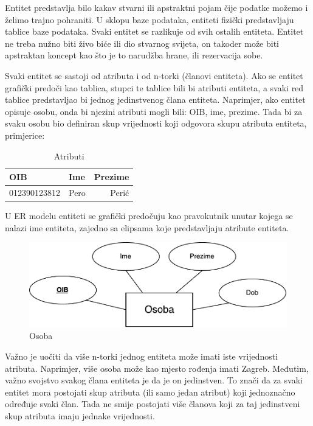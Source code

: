 \documentclass[times, utf8, zavrsni]{fer}
\begin{document}
Entitet predstavlja bilo kakav stvarni ili apstraktni pojam čije podatke možemo i želimo trajno pohraniti. U sklopu baze podataka, entiteti fizički predstavljaju tablice baze podataka. Svaki entitet se razlikuje od svih ostalih entiteta. Entitet ne treba nužno biti živo biće ili dio stvarnog svijeta, on takoder može biti apstraktan koncept kao što je to narudžba hrane, ili rezervacija sobe.

Svaki entitet se sastoji od atributa i od n-torki (članovi entiteta). Ako se entitet grafički predoči kao tablica, stupci te tablice bili bi atributi entiteta, a svaki red tablice predstavljao bi jednog jedinstvenog člana entiteta. Naprimjer, ako entitet opisuje osobu, onda bi njezini atributi mogli bili: OIB, ime, prezime. Tada bi za svaku osobu bio definiran skup vrijednosti koji odgovora skupu atributa entiteta, primjerice:\\

\begin{table}[H]
\caption{Atributi}
\label{tbl:atributi}
\centering
\begin{tabular}{llr}
\hline
OIB & Ime & Prezime\\
\hline
012390123812 & Pero & Perić\\
\hline
\end{tabular}
\end{table}

U ER modelu entiteti se grafički predočuju kao pravokutnik unutar kojega se nalazi ime entiteta, zajedno sa elipsama koje predstavljaju atribute entiteta.\\

\begin{figure}[H]
\centering
\includegraphics[scale=0.8]{img/osoba.pdf}
\caption{Osoba}
\label{fig:osoba}
\end{figure}

Važno je uočiti da više n-torki jednog entiteta može imati iste vrijednosti atributa. Naprimjer, više osoba može kao mjesto rođenja imati Zagreb. Međutim, važno svojstvo svakog člana entiteta je da je on jedinstven. To znači da za svaki entitet mora postojati skup atributa (ili samo jedan atribut) koji jednoznačno određuje svaki član. Tada ne smije postojati više članova koji za taj jedinstveni skup atributa imaju jednake vrijednosti.
\end{document}

